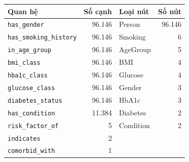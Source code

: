 \begin{tabular}{lrlr}
\toprule
Quan hệ & Số cạnh & Loại nút & Số nút \\
\midrule
\texttt{has\_gender} & 96{.}146 & Person & 96{.}146 \\
\texttt{has\_smoking\_history} & 96{.}146 & Smoking & 6 \\
\texttt{in\_age\_group} & 96{.}146 & AgeGroup & 5 \\
\texttt{bmi\_class} & 96{.}146 & BMI & 4 \\
\texttt{hba1c\_class} & 96{.}146 & Glucose & 4 \\
\texttt{glucose\_class} & 96{.}146 & Gender & 3 \\
\texttt{diabetes\_status} & 96{.}146 & HbA1c & 3 \\
\texttt{has\_condition} & 11{.}384 & Diabetes & 2 \\
\texttt{risk\_factor\_of} & 5 & Condition & 2 \\
\texttt{indicates} & 2 &  &  \\
\texttt{comorbid\_with} & 1 &  &  \\
\bottomrule
\end{tabular}
